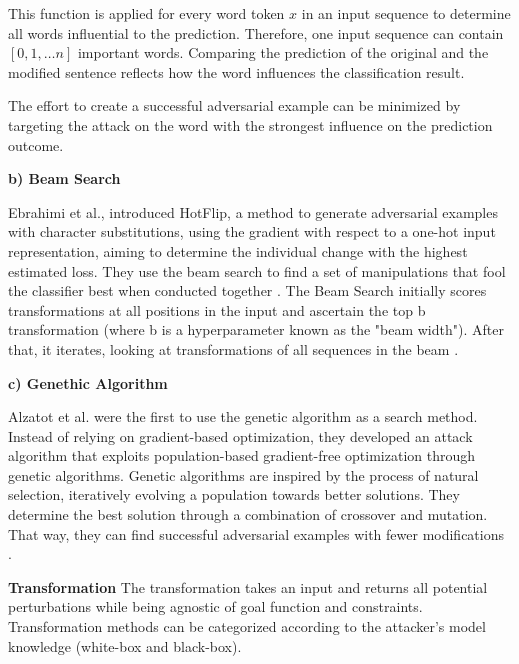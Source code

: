            

            This function is applied for every word token $x$ in an input sequence to determine all words influential to the prediction. Therefore, one input sequence can contain ${[0,1, \dots n]}$ important words. 
            Comparing the prediction of the original and the modified sentence reflects how the word influences the classification result.  

         The effort to create a successful adversarial example can be minimized by targeting the attack on the word with the strongest influence on the prediction outcome. 
        
    \textbf{b) Beam Search}
    
        Ebrahimi et al., introduced HotFlip, a method to generate adversarial examples with character substitutions, using the gradient with respect to a one-hot input representation, aiming to determine the individual change with the highest estimated loss. They use the beam search to find a set of manipulations that fool the classifier best when conducted together \cite{ebrahimi2017hotflip}. The Beam Search initially scores transformations at all positions in the input and ascertain the top b transformation (where b is a hyperparameter known as the "beam width"). After that, it iterates, looking at transformations of all sequences in the beam \cite{tillmann2003word}. 
        
    \textbf{c) Genethic Algorithm}
    
        Alzatot et al. were the first to use the genetic algorithm as a search method. Instead of relying on gradient-based optimization, they developed an attack algorithm that exploits population-based gradient-free optimization through genetic algorithms. Genetic algorithms are inspired by the process of natural selection, iteratively evolving a population towards better solutions. They determine the best solution through a combination of crossover and mutation. That way, they can find successful adversarial examples with fewer modifications \cite{alzantot2018generating}.
        
        
\textbf{Transformation}
\label{sec:transformation}
    The transformation takes an input and returns all potential perturbations while being agnostic of goal function and constraints. Transformation methods can be categorized according to the attacker's model knowledge (white-box and black-box).

